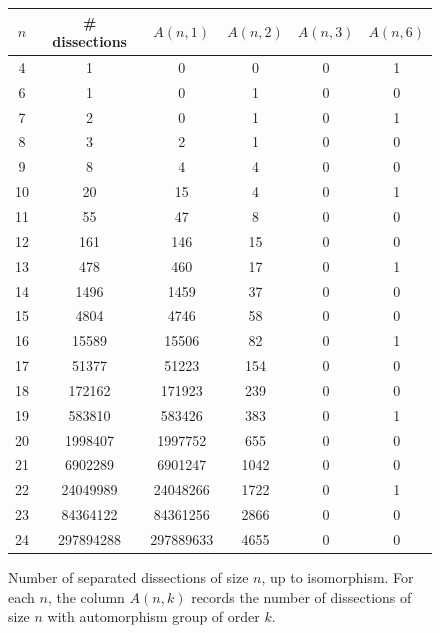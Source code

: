 \documentclass[12pt,amstags,fleqn]{article}
\theoremstyle{plain}
\theoremstyle{definition}
\begin{document}
\begin{figure}[htbp]
\begin{center}
\begin{tabular}{|c|c|c|c|c|c|}
\hline $n$ & \# dissections & $A(n,1)$ & $A(n,2)$ & $A(n,3)$ & $A(n,6)$ \\
\hline
\hline 4  & 1 & 0 & 0 & 0 & 1 \\
\hline 6  & 1 & 0 & 1 & 0 & 0 \\
\hline 7  & 2 & 0 & 1 & 0 & 1 \\
\hline 8  & 3 & 2 & 1 & 0 & 0 \\
\hline 9  & 8 & 4 & 4 & 0 & 0 \\
\hline 10 & 20 & 15 & 4 & 0 & 1 \\
\hline 11 & 55 & 47 & 8 & 0 & 0 \\
\hline 12 & 161 & 146 & 15 & 0 & 0 \\
\hline 13 & 478 & 460 & 17 & 0 & 1 \\
\hline 14 & 1496 & 1459 & 37 & 0 & 0 \\
\hline 15 & 4804 & 4746 & 58 & 0 & 0 \\
\hline 16 & 15589 & 15506 & 82 & 0 & 1 \\
\hline 17 & 51377 & 51223 & 154 & 0 & 0 \\
\hline 18 & 172162 & 171923 & 239 & 0 & 0 \\
\hline 19 & 583810 & 583426 & 383 & 0 & 1 \\
\hline 20 & 1998407 & 1997752 & 655 & 0 & 0 \\
\hline 21 & 6902289 & 6901247 & 1042 & 0 & 0 \\
\hline 22 & 24049989 & 24048266 & 1722 & 0 & 1 \\
\hline 23 & 84364122 & 84361256 & 2866 & 0 & 0 \\
\hline 24 & 297894288 & 297889633 & 4655 & 0 & 0 \\
\hline
\end{tabular}
\end{center}
\caption{Number of separated dissections of size $n$, up to isomorphism.
For each $n$, the column $A(n,k)$
records the number of dissections of size $n$ with
automorphism group of order $k$.}
\label{figCountSeparated}
\end{figure}
%
%
\end{document}
